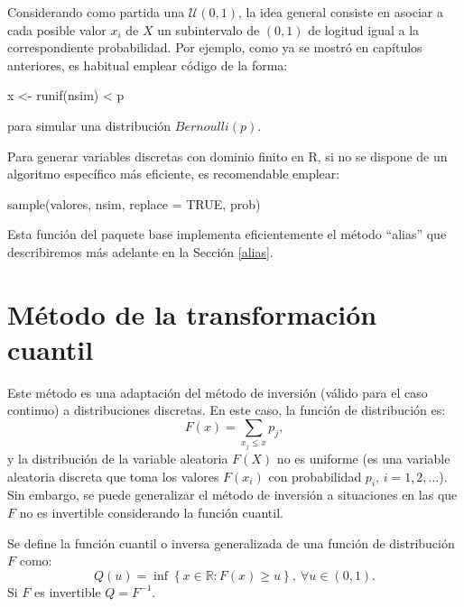 \documentclass[
]{book}
\newenvironment{Shaded}{\begin{snugshade}}{\end{snugshade}}
\newcommand{\AttributeTok}[1]{\textcolor[rgb]{0.77,0.63,0.00}{#1}}
\newcommand{\ConstantTok}[1]{\textcolor[rgb]{0.00,0.00,0.00}{#1}}
\newcommand{\FunctionTok}[1]{\textcolor[rgb]{0.00,0.00,0.00}{#1}}
\newcommand{\NormalTok}[1]{#1}
\newcommand{\OtherTok}[1]{\textcolor[rgb]{0.56,0.35,0.01}{#1}}
\newcommand{\SpecialCharTok}[1]{\textcolor[rgb]{0.00,0.00,0.00}{#1}}
\theoremstyle{break}
\theoremstyle{definition}
\theoremstyle{definition}
\theoremstyle{definition}
\theoremstyle{definition}
\theoremstyle{remark}
\begin{document}
Considerando como partida una \(\mathcal{U}\left( 0,1\right)\), la
idea general consiste en asociar a cada posible valor \(x_{i}\) de \(X\)
un subintervalo de \(\left( 0,1\right)\) de logitud igual a la correspondiente
probabilidad.
Por ejemplo, como ya se mostró en capítulos anteriores, es habitual emplear
código de la forma:

\begin{Shaded}
\begin{Highlighting}[]
\NormalTok{x }\OtherTok{\textless{}{-}} \FunctionTok{runif}\NormalTok{(nsim) }\SpecialCharTok{\textless{}}\NormalTok{ p}
\end{Highlighting}
\end{Shaded}

para simular una distribución \(Bernoulli(p)\).

Para generar variables discretas con dominio finito en R,
si no se dispone de un algoritmo específico más eficiente,
es recomendable emplear:

\begin{Shaded}
\begin{Highlighting}[]
\FunctionTok{sample}\NormalTok{(valores, nsim, }\AttributeTok{replace =} \ConstantTok{TRUE}\NormalTok{, prob)}
\end{Highlighting}
\end{Shaded}

Esta función del paquete base implementa eficientemente el método ``alias''
que describiremos más adelante en la Sección \ref{alias}.

\hypertarget{muxe9todo-de-la-transformaciuxf3n-cuantil}{%
\section{Método de la transformación cuantil}\label{muxe9todo-de-la-transformaciuxf3n-cuantil}}

Este método es una adaptación del método de inversión (válido para el
caso continuo) a distribuciones discretas. En este caso,
la función de distribución es:
\[F\left( x\right)  =\sum_{x_{j}\leq x}p_{j},\]
y la distribución de la variable aleatoria \(F\left( X\right)\) no es uniforme
(es una variable aleatoria discreta que toma los valores
\(F\left( x_{i} \right)\) con probabilidad \(p_{i}\), \(i=1,2,\ldots\)).
Sin embargo, se puede generalizar el método de inversión a situaciones
en las que \(F\) no es invertible considerando la función cuantil.

Se define la función cuantil o inversa generalizada de una función de distribución \(F\) como:
\[Q\left( u\right) =\inf \left\{ x\in \mathbb{R}:F\left( x\right) \geq
u\right\} ,\ \forall u\in \left( 0,1\right).\]
Si \(F\) es invertible \(Q=F^{-1}\).
\end{document}
